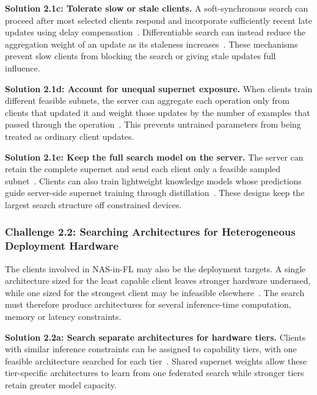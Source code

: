 \noindent\textbf{Solution 2.1c: Tolerate slow or stale clients.} A soft-synchronous search can proceed after most selected clients respond and incorporate sufficiently recent late updates using delay compensation~\cite{rl_fednas_2021}. Differentiable search can instead reduce the aggregation weight of an update as its staleness increases~\cite{fedregnas_2025}. These mechanisms prevent slow clients from blocking the search or giving stale updates full influence.

\noindent\textbf{Solution 2.1d: Account for unequal supernet exposure.} When clients train different feasible subnets, the server can aggregate each operation only from clients that updated it and weight those updates by the number of examples that passed through the operation~\cite{fedoras_2022,fgfl_2024,supernet_trade-off_fednas_2025}. This prevents untrained parameters from being treated as ordinary client updates.

\noindent\textbf{Solution 2.1e: Keep the full search model on the server.} The server can retain the complete supernet and send each client only a feasible sampled subnet~\cite{perfedrlnas_2024,rafl_2024}. Clients can also train lightweight knowledge models whose predictions guide server-side supernet training through distillation~\cite{hapfnas_2025}. These designs keep the largest search structure off constrained devices.

\subsubsection{Challenge 2.2: Searching Architectures for Heterogeneous Deployment Hardware}

The clients involved in NAS-in-FL may also be the deployment targets. A single architecture sized for the least capable client leaves stronger hardware underused, while one sized for the strongest client may be infeasible elsewhere~\cite{fedoras_2022}. The search must therefore produce architectures for several inference-time computation, memory or latency constraints.

\noindent\textbf{Solution 2.2a: Search separate architectures for hardware tiers.} Clients with similar inference constraints can be assigned to capability tiers, with one feasible architecture searched for each tier~\cite{fedoras_2022,clustered_direct_fednas_2022}. Shared supernet weights allow these tier-specific architectures to learn from one federated search while stronger tiers retain greater model capacity.

